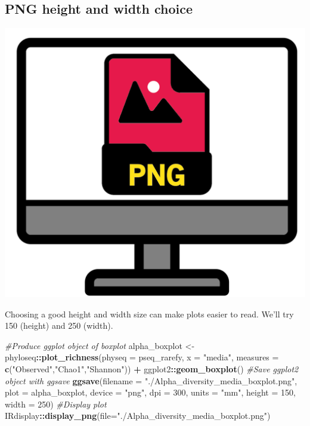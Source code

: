 \documentclass[
]{book}
\newenvironment{Shaded}{\begin{snugshade}}{\end{snugshade}}
\newcommand{\AttributeTok}[1]{\textcolor[rgb]{0.13,0.29,0.53}{#1}}
\newcommand{\CommentTok}[1]{\textcolor[rgb]{0.56,0.35,0.01}{\textit{#1}}}
\newcommand{\DecValTok}[1]{\textcolor[rgb]{0.00,0.00,0.81}{#1}}
\newcommand{\FunctionTok}[1]{\textcolor[rgb]{0.13,0.29,0.53}{\textbf{#1}}}
\newcommand{\NormalTok}[1]{#1}
\newcommand{\OtherTok}[1]{\textcolor[rgb]{0.56,0.35,0.01}{#1}}
\newcommand{\SpecialCharTok}[1]{\textcolor[rgb]{0.81,0.36,0.00}{\textbf{#1}}}
\newcommand{\StringTok}[1]{\textcolor[rgb]{0.31,0.60,0.02}{#1}}
\begin{document}
\hypertarget{png-height-and-width-choice}{%
\subsection{PNG height and width choice}\label{png-height-and-width-choice}}

\includegraphics{figures/display_png.png}

Choosing a good height and width size can make plots easier to read.
We'll try 150 (height) and 250 (width).

\begin{Shaded}
\begin{Highlighting}[]
\CommentTok{\#Produce ggplot object of boxplot}
\NormalTok{alpha\_boxplot }\OtherTok{\textless{}{-}}\NormalTok{ phyloseq}\SpecialCharTok{::}\FunctionTok{plot\_richness}\NormalTok{(}\AttributeTok{physeq =}\NormalTok{ pseq\_rarefy, }
                        \AttributeTok{x =} \StringTok{"media"}\NormalTok{,}
                        \AttributeTok{measures =} \FunctionTok{c}\NormalTok{(}\StringTok{"Observed"}\NormalTok{,}\StringTok{"Chao1"}\NormalTok{,}\StringTok{"Shannon"}\NormalTok{)) }\SpecialCharTok{+}
\NormalTok{                          ggplot2}\SpecialCharTok{::}\FunctionTok{geom\_boxplot}\NormalTok{()}
\CommentTok{\#Save ggplot2 object with ggsave}
\FunctionTok{ggsave}\NormalTok{(}\AttributeTok{filename =} \StringTok{"./Alpha\_diversity\_media\_boxplot.png"}\NormalTok{, }\AttributeTok{plot =}\NormalTok{ alpha\_boxplot,}
       \AttributeTok{device =} \StringTok{"png"}\NormalTok{, }\AttributeTok{dpi =} \DecValTok{300}\NormalTok{, }\AttributeTok{units =} \StringTok{"mm"}\NormalTok{, }\AttributeTok{height =} \DecValTok{150}\NormalTok{, }\AttributeTok{width =} \DecValTok{250}\NormalTok{)}
\CommentTok{\#Display plot}
\NormalTok{IRdisplay}\SpecialCharTok{::}\FunctionTok{display\_png}\NormalTok{(}\AttributeTok{file=}\StringTok{"./Alpha\_diversity\_media\_boxplot.png"}\NormalTok{)}
\end{Highlighting}
\end{Shaded}
\end{document}
